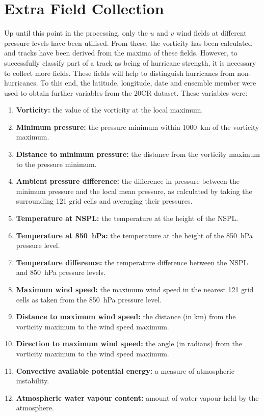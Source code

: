 \documentclass[pdftex,12pt,a4paper]{report}
\begin{document}
\newpage
\section{Extra Field Collection}
\label{sec:extra_field_collection}

Up until this point in the processing, only the $u$ and $v$ wind fields at different pressure levels
have been utilised. From these, the vorticity has been calculated and tracks have been derived from
the maxima of these fields. However, to successfully classify part of a track as being of hurricane
strength, it is necessary to collect more fields. These fields will help to distinguish hurricanes
from non-hurricanes. To this end, the latitude, longitude, date and ensemble member were used to
obtain further variables from the 20CR dataset. These variables were:

\begin{enumerate}
   \item \textbf{Vorticity:} the value of the vorticity at the local maximum.
    \item \textbf{Minimum pressure:} the pressure minimum within \SI{1000}{km} of the vorticity
        maximum.
    \item \textbf{Distance to minimum pressure:} the distance from the vorticity maximum to the
        pressure minimum.
    \item \textbf{Ambient pressure difference:} the difference in pressure between the minimum
        pressure and the local mean pressure, as calculated by taking the surrounding 121 grid cells
        and averaging their pressures.
    \item \textbf{Temperature at NSPL:} the temperature at the height of the NSPL.
    \item \textbf{Temperature at \SI{850}{hPa}:} the temperature at the height of the \SI{850}{hPa}
        pressure level.
    \item \textbf{Temperature difference:} the temperature difference between the NSPL and
        \SI{850}{hPa} pressure levels.
    \item \textbf{Maximum wind speed:} the maximum wind speed in the nearest 121 grid cells as taken
        from the \SI{850}{hPa} pressure level.
    \item \textbf{Distance to maximum wind speed:} the distance (in km) from the vorticity
        maximum to the wind speed maximum.
    \item \textbf{Direction to maximum wind speed:} the angle (in radians) from the vorticity
        maximum to the wind speed maximum.
    \item \textbf{Convective available potential energy:} a measure of atmospheric instability.
    \item \textbf{Atmospheric water vapour content:} amount of water vapour held by the atmosphere.
\end{enumerate}
\end{document}
